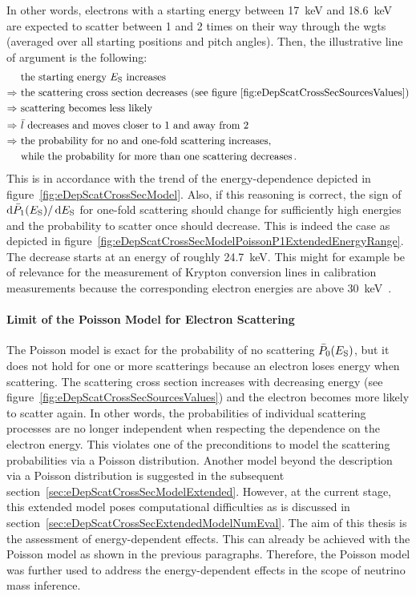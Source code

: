 In other words, electrons with a starting energy between \SI{17}{keV} and \SI{18.6}{keV} are expected to scatter between 1 and 2 times on their way through the \gls{wgts} (averaged over all starting positions and pitch angles). Then, the illustrative line of argument is the following: 
\begin{align*}
	&\text{ the starting energy $E_\mathrm{S}$ increases} \\ \Rightarrow
	&\text{ the scattering cross section decreases (see figure~\ref{fig:eDepScatCrossSecSourcesValues})} \\ \Rightarrow
	&\text{ scattering becomes less likely} \\ \Rightarrow
	&\text{ $\bar{l}$ decreases and moves closer to 1 and away from 2} \\ \Rightarrow
	&\text{ the probability for no and one-fold scattering increases,} \\
	&\text{ while the probability for more than one scattering decreases}
	\text{\,.}
\end{align*} 
This is in accordance with the trend of the energy-dependence depicted in figure~\ref{fig:eDepScatCrossSecModel}. Also, if this reasoning is correct, the sign of $\mathop{}\!\mathrm{d} \bar{P}_1(E_\mathrm{S}) / \mathop{}\!\mathrm{d} E_\mathrm{S}$ for one-fold scattering should change for sufficiently high energies and the probability to scatter once should decrease. This is indeed the case as depicted in figure~\ref{fig:eDepScatCrossSecModelPoissonP1ExtendedEnergyRange}. The decrease starts at an energy of roughly \SI{24.7}{keV}. This might for example be of relevance for the measurement of Krypton conversion lines in calibration measurements because the corresponding electron energies are above \SI{30}{keV}~\cite{venos2018}.


\paragraph{Limit of the Poisson Model for Electron Scattering}
The Poisson model is exact for the probability of no scattering $\bar{P}_0(E_\mathrm{S})$, but it does not hold for one or more scatterings because an electron loses energy when scattering. The scattering cross section increases with decreasing energy (see figure~\ref{fig:eDepScatCrossSecSourcesValues}) and the electron becomes more likely to scatter again. In other words, the probabilities of individual scattering processes are no longer independent when respecting the dependence on the electron energy. This violates one of the preconditions to model the scattering probabilities via a Poisson distribution. Another model beyond the description via a Poisson distribution is suggested in the subsequent section~\ref{sec:eDepScatCrossSecModelExtended}. However, at the current stage, this extended model poses computational difficulties as is discussed in section~\ref{sec:eDepScatCrossSecExtendedModelNumEval}. The aim of this thesis is the assessment of energy-dependent effects. This can already be achieved with the Poisson model as shown in the previous paragraphs. Therefore, the Poisson model was further used to address the energy-dependent effects in the scope of neutrino mass inference.
\FloatBarrier

